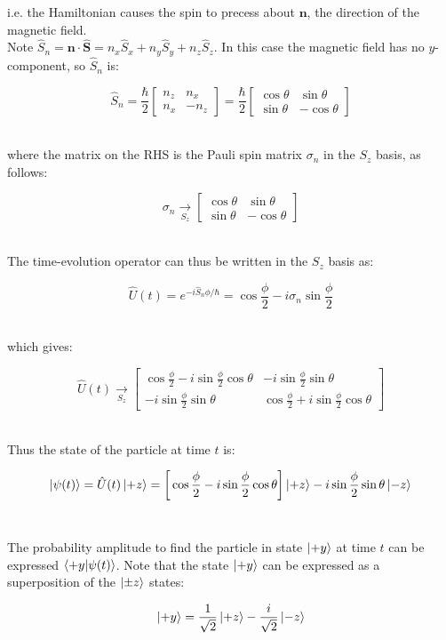 \documentclass[14pt]{extarticle}
\renewcommand{\v}[1]{{\bm #1}}
\newcommand{\hv}[1]{\hat{\bm{#1}}}
\begin{document}
i.e. the Hamiltonian causes the spin to precess about $\v n$, the direction of the magnetic field. \\ 

Note $\hat S_n = \v n \cdot \hv S = n_x \hat S_x + n_y \hat S_y + n_z \hat S_z$. In this case the magnetic field has no $y$-component, so $\hat S_n$ is:

$$\hat S_n = \frac \hbar 2\begin{bmatrix} n_z & n_x \\ n_x & -n_z \end{bmatrix} = \frac \hbar 2 \begin{bmatrix} \cos\theta & \sin\theta \\ \sin\theta & -\cos\theta \end{bmatrix}$$ \ 

where the matrix on the RHS is the Pauli spin matrix $\sigma_n$ in the $S_z$ basis, as follows: 

$$\sigma_n \xrightarrow[S_z]{} \begin{bmatrix} \cos\theta & \sin\theta \\ \sin\theta & -\cos\theta \end{bmatrix}$$ \ 

The time-evolution operator can thus be written in the $S_z$ basis as:

$$\hat U(t) = e^{-i \hat S_n \phi / \hbar} = \cos \frac \phi 2 - i\sigma_n \sin \frac \phi 2$$ \ 

which gives:

$$\hat U(t) \xrightarrow[S_z]{} 
\begin{bmatrix}
	\cos \frac \phi 2 - i\sin \frac \phi 2 \cos\theta & -i\sin\frac \phi 2 \sin\theta \\ 
	-i\sin\frac \phi 2 \sin\theta & \cos \frac \phi 2 + i\sin\frac \phi 2\cos\theta
\end{bmatrix}
$$ \ 

Thus the state of the particle at time $t$ is:

$$\ket{\psi(t)} = \hat U(t) \ket{+z} = \bigg[ \cos \frac \phi 2 - i\sin\frac \phi 2 \cos\theta \bigg] \ket{+z} - i\sin\frac \phi 2 \sin\theta \ket{-z}$$ \ 

The probability amplitude to find the particle in state $\ket{+y}$ at time $t$ can be expressed $\bra{+y}\ket{\psi(t)}$. Note that the state $\ket{+y}$ can be expressed as a superposition of the $\ket{\pm z}$ states:

$$\ket{+y} = \frac{1}{\sqrt 2} \ket{+z} - \frac{i}{\sqrt 2} \ket{-z}$$ \ 
\end{document}
